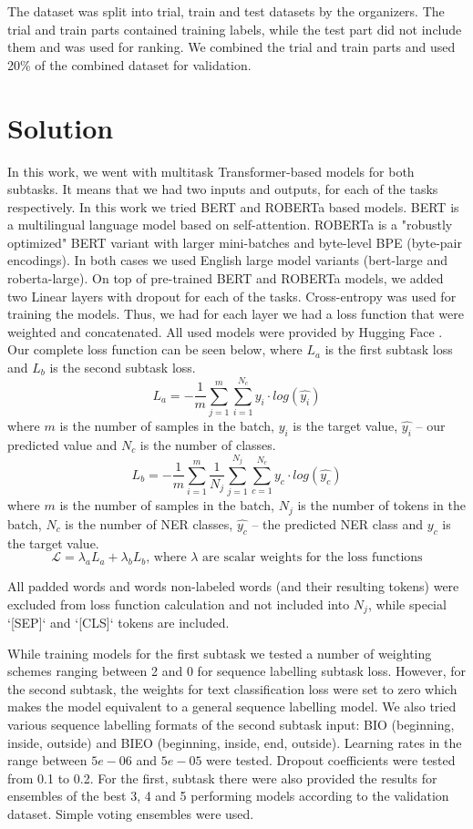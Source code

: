 \documentclass[11pt]{article}
\begin{document}
The dataset was split into trial, train and test datasets by the organizers. The trial and train parts contained training labels, while the test part did not include them and was used for ranking. We combined the trial and train parts and used 20\% of the combined dataset for validation.


\section{Solution}
In this work, we went with multitask Transformer-based models for both subtasks. It means that we had two inputs and outputs, for each of the tasks respectively. In this work we tried BERT \cite{bert} and ROBERTa \cite{roberta} based models. BERT is a multilingual language model based on self-attention. ROBERTa is a "robustly optimized" BERT variant with larger mini-batches and byte-level BPE (byte-pair encodings). In both cases we used English large model variants (bert-large and roberta-large). On top of pre-trained BERT and ROBERTa models, we added two Linear layers with dropout for each of the tasks. Cross-entropy was used for training the models. Thus, we had for each layer we had a loss function that were weighted and concatenated. All used models were provided by Hugging Face \cite{Wolf2019HuggingFacesTS}. Our complete loss function can be seen below, where ${L}_{a}$ is the first subtask loss and ${L}_b$ is the second subtask loss.
$${L}_a = -\frac{1}{m}\sum_{j=1}^{m}\sum_{i=1}^{N_c}y_i \cdot log(\hat{y_i}) $$
where $m$ is the number of samples in the batch, $y_i$ is the target value,
$\hat{y_i}$ -- our predicted value and $N_c$ is the number of classes.
$${L}_b = -\frac{1}{m}\sum^{m}_{i=1}\frac{1}{N_j}\sum^{N_j}_{j=1}\sum_{c=1}^{N_c}y_c \cdot log(\hat{y_c}) $$
where $m$ is the number of samples in the batch, $N_j$ is the number of tokens in the batch, $N_c$ is the number of NER classes, $\hat{y_c}$ -- the predicted NER class and $y_c$ is the target value.
$$\mathcal{L} = \lambda_a{L}_a + \lambda_b{L}_b \textrm{, where $\lambda$ are scalar weights for the loss functions}$$

All padded words and words non-labeled words (and their resulting tokens) were excluded from loss function calculation and not included into $N_j$, while special `[SEP]` and `[CLS]` tokens are included.


While training models for the first subtask we tested a number of weighting schemes ranging between 2 and 0 for sequence labelling subtask loss. However, for the second subtask, the weights for text classification loss were set to zero which makes the model equivalent to a general sequence labelling model. We also tried various sequence labelling formats of the second subtask input: BIO (beginning, inside, outside) and BIEO (beginning, inside, end, outside). Learning rates in the range between $5e-06$ and $5e-05$ were tested. Dropout coefficients were tested from 0.1 to 0.2. For the first, subtask there were also provided the results for ensembles of the best 3, 4 and 5 performing models according to the validation dataset. Simple voting ensembles were used.
\end{document}
